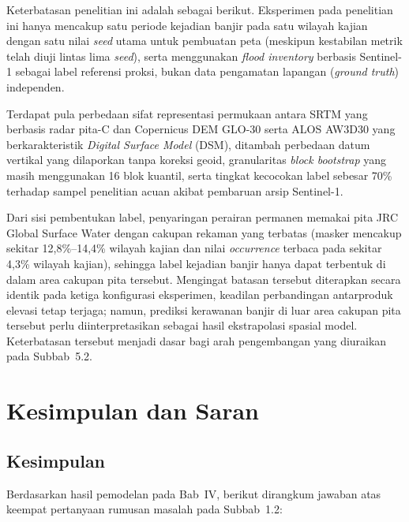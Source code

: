 \documentclass[12pt]{article}
\begin{document}
Keterbatasan penelitian ini adalah sebagai berikut. Eksperimen pada penelitian
ini hanya mencakup satu periode kejadian banjir pada satu wilayah kajian
dengan satu nilai \textit{seed} utama untuk pembuatan peta (meskipun
kestabilan metrik telah diuji lintas lima \textit{seed}), serta menggunakan
\textit{flood inventory} berbasis Sentinel-1 sebagai label referensi proksi,
bukan data pengamatan lapangan (\textit{ground truth}) independen.

Terdapat pula perbedaan sifat representasi permukaan
antara SRTM yang berbasis radar pita-C dan Copernicus DEM GLO-30 serta ALOS
AW3D30 yang berkarakteristik \textit{Digital Surface Model} (DSM), ditambah
perbedaan datum vertikal yang dilaporkan tanpa koreksi geoid, granularitas
\textit{block bootstrap} yang masih menggunakan 16 blok kuantil, serta tingkat
kecocokan label sebesar 70\% terhadap sampel penelitian acuan akibat pembaruan
arsip Sentinel-1.

Dari sisi pembentukan label, penyaringan
perairan permanen memakai pita JRC Global Surface Water dengan cakupan
rekaman yang terbatas (masker mencakup sekitar 12,8\%--14,4\% wilayah kajian dan nilai
\textit{occurrence} terbaca pada sekitar 4,3\% wilayah kajian), sehingga label
kejadian banjir hanya dapat terbentuk di dalam area cakupan pita tersebut.
Mengingat batasan tersebut diterapkan secara identik pada ketiga konfigurasi
eksperimen, keadilan perbandingan antarproduk elevasi tetap terjaga; namun,
prediksi kerawanan banjir di luar area cakupan pita tersebut perlu
diinterpretasikan sebagai hasil ekstrapolasi spasial model. Keterbatasan
tersebut menjadi dasar bagi arah pengembangan yang diuraikan pada
Subbab~5.2.

\FloatBarrier

\clearpage


\section{Kesimpulan dan Saran}

\subsection{Kesimpulan}

Berdasarkan hasil pemodelan pada Bab~IV, berikut dirangkum jawaban atas
keempat pertanyaan rumusan masalah pada Subbab~1.2:
\end{document}
